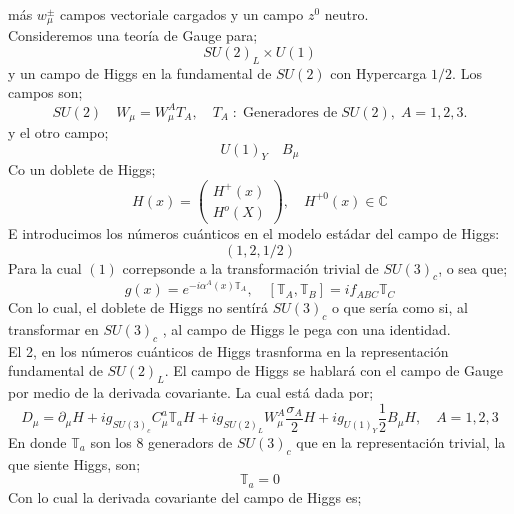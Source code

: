 \documentclass[../main.tex]{subfiles}
\begin{document}
  más $w^{\pm}_\mu$ campos vectoriale cargados y un campo $z^0$ neutro. \\
  Consideremos una teoría de Gauge para;
  \begin{equation}
    SU(2)_L\times U(1)
   \end{equation}
y un campo de Higgs en la fundamental de $SU(2)$ con Hypercarga $1/2$. Los campos son;
\begin{equation}
  SU(2) \quad W_\mu = W^A_\mu T_A, \quad T_A \; : \; \text{Generadores de}\; SU(2), \; A=1,2,3.
 \end{equation}
 y el otro campo;
 \begin{equation}
   U(1)_Y\quad B_\mu 
  \end{equation}
Co un doblete de Higgs;
\begin{equation}
  H(x) = \begin{pmatrix}
    H^+(x) \\ H^o(X)
  \end{pmatrix},\quad H^{+0}(x) \in \mathbb{C}
 \end{equation}
E introducimos los números cuánticos en el modelo estádar del campo de Higgs:
\begin{equation}
  \left( 1,2,1/2 \right)
 \end{equation}
 Para la cual $(1)$ correpsonde a la transformación trivial de $SU(3)_c$, o sea que;
 \begin{equation}
   g(x) = e^{-i\alpha^A(x)\mathbb{T}_A}, \quad \left[ \mathbb{T}_A , \mathbb{T}_B \right] = if_{ABC}\mathbb{T}_C
\end{equation}
Con lo cual, el doblete de Higgs no sentírá $SU(3)_c$ o que sería como si, al transformar en $SU(3)_c$ , al campo de Higgs le pega con una identidad. \\
El 2, en los números cuánticos de Higgs trasnforma en la representación fundamental de $SU(2)_L$. El campo de Higgs se hablará con el campo de Gauge por medio de la derivada covariante. La cual está dada por;
\begin{equation}
  D_\mu  =\partial_\mu H +  ig_{SU(3)_c}C_\mu^a \mathbb{T}_aH + ig_{SU(2)_L} W^A_\mu \frac{\sigma_A}{2} H + ig_{U(1)_Y}\frac{1}{2}B_\mu H, \quad A=1,2,3 
 \end{equation}
 En donde $\mathbb{T}_a$ son los 8 generadors de $SU(3)_c$ que en la representación trivial, la que siente Higgs, son;
 \begin{equation}
   \mathbb{T}_a = 0
  \end{equation}
  Con lo cual la derivada covariante del campo de Higgs es;
\end{document}
